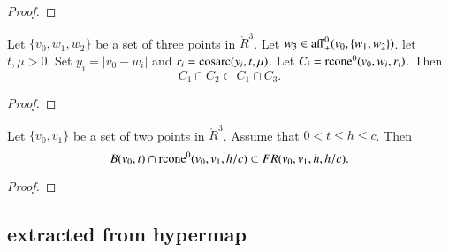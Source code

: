 \begin{tarskidata}
\begin{tarski}
\begin{proof}
\end{proof}
\end{tarski}





\begin{tarski}

\begin{lemma}
Let $\{v_0,w_1,w_2\}$ be a set of three points in $\ring{R}^3$.
Let $w_3 \in {\operatorname{aff}}_+^0(v_0,\{w_1,w_2\})$.
let $t,\mu > 0$.  Set $y_i=|v_0-w_i|$
and $r_i={\operatorname{cosarc}}(y_i,t,\mu)$.
Let $C_i={\operatorname{rcone}}^0(v_0,w_i,r_i)$.
Then
  $$
  C_1 \cap C_2 \subset C_1 \cap C_3.
  $$
\end{lemma}

\begin{proof}
\end{proof}
\end{tarski}






\begin{tarski}

\begin{lemma}
Let $\{v_0,v_1\}$ be a set of two points in $\ring{R}^3$.
Assume that $0 < t \le h \le c$.  Then
$$
B(v_0,t) \cap {\operatorname{rcone}}^0(v_0,v_1,h/c) \subset
FR(v_0,v_1,h,h/c).
$$
\end{lemma}

\begin{proof}
\end{proof}
\end{tarski}








\begin{tarski}
\subsection{extracted from hypermap}


\end{tarski}
\end{tarskidata}
